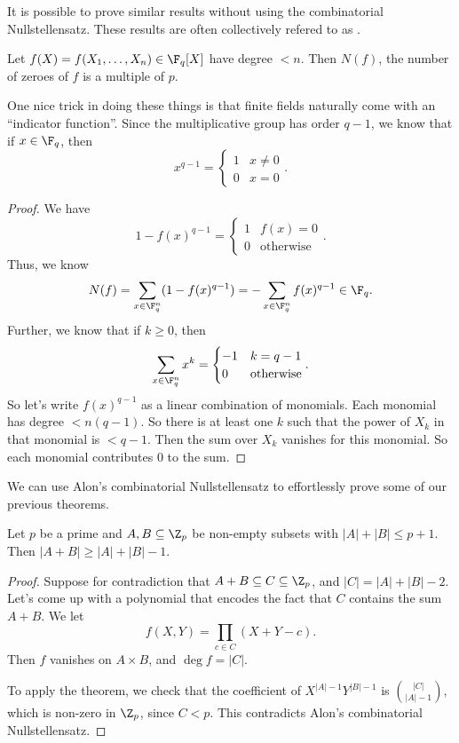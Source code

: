 \documentclass[a4paper]{article}
\begin{document}
It is possible to prove similar results without using the combinatorial Nullstellensatz. These results are often collectively refered to as .
\begin{thm}[Warning]
  Let $f(X) = f(X_1, \ldots, X_n) \in \F_q[X]$ have degree $< n$. Then $N(f)$, the number of zeroes of $f$ is a multiple of $p$.
\end{thm}

One nice trick in doing these things is that finite fields naturally come with an ``indicator function''. Since the multiplicative group has order $q - 1$, we know that if $x \in \F_q$, then
\[
  x^{q - 1} =
  \begin{cases}
    1 & x \not= 0\\
    0 & x = 0
  \end{cases}.
\]
\begin{proof}
  We have
  \[
    1 - f(x)^{q - 1} =
    \begin{cases}
      1 & f(x) = 0\\
      0 & \text{otherwise}
    \end{cases}.
  \]
  Thus, we know
  \[
    N(f) = \sum_{x \in \F_q^n} (1 - f(x)^{q - 1}) = -\sum_{x \in \F_q^n} f(x)^{q - 1} \in \F_q.
  \]
  Further, we know that if $k \geq 0$, then
  \[
    \sum_{x \in \F_q^n} x^k =
    \begin{cases}
      -1 & k = q - 1\\
      0 & \text{otherwise}
    \end{cases}.
  \]
  So let's write $f(x)^{q - 1}$ as a linear combination of monomials. Each monomial has degree $<n(q - 1)$. So there is at least one $k$ such that the power of $X_k$ in that monomial is $< q - 1$. Then the sum over $X_k$ vanishes for this monomial. So each monomial contributes $0$ to the sum.
\end{proof}

We can use Alon's combinatorial Nullstellensatz to effortlessly prove some of our previous theorems.
\begin{thm}
  Let $p$ be a prime and $A, B \subseteq \Z_p$ be non-empty subsets with $|A| + |B| \leq p + 1$. Then $|A + B| \geq |A| + |B| - 1$.
\end{thm}

\begin{proof}
  Suppose for contradiction that $A + B \subseteq C \subseteq \Z_p$, and $|C| = |A| + |B| - 2$. Let's come up with a polynomial that encodes the fact that $C$ contains the sum $A + B$. We let
  \[
    f(X, Y) = \prod_{c \in C} (X + Y - c).
  \]
  Then $f$ vanishes on $A \times B$, and $\deg f = |C|$.

  To apply the theorem, we check that the coefficient of $X^{|A| - 1} Y^{|B| - 1}$ is $\binom{|C|}{|A| - 1}$, which is non-zero in $\Z_p$, since $C < p$. This contradicts Alon's combinatorial Nullstellensatz.
\end{proof}
\end{document}
